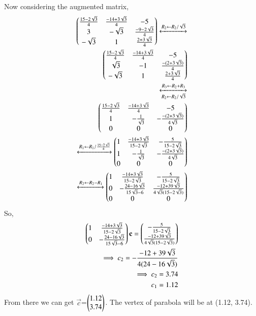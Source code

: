 \documentclass[journal,12pt,twocolumn]{IEEEtran}
\begin{document}
Now considering the augmented matrix,
\begin{align}
\begin{pmatrix}\frac{15-2\sqrt{3}}{4} & \frac{-14+3\sqrt{3}}{4} & -5\\3 & -\sqrt{3} & \frac{-9-2\sqrt{3}}{4}\\-\sqrt{3} & 1 & \frac{2+3\sqrt{3}}{4}\end{pmatrix}\xleftrightarrow[]{R_2\leftarrow R_2/\sqrt{3}}\\
\begin{pmatrix}\frac{15-2\sqrt{3}}{4} & \frac{-14+3\sqrt{3}}{4} & -5\\\sqrt{3} & -1 & \frac{-(2+3\sqrt{3})}{4}\\-\sqrt{3} & 1 & \frac{2+3\sqrt{3}}{4}\end{pmatrix}\\
\xleftrightarrow[R_2\leftarrow R_2/\sqrt{3}]{R_3\leftarrow R_2+R_3}\\
\begin{pmatrix}\frac{15-2\sqrt{3}}{4} & \frac{-14+3\sqrt{3}}{4} & -5\\1 & -\frac{1}{\sqrt{3}} & -\frac{-(2+3\sqrt{3})}{4\sqrt{3}}\\0 & 0 & 0\end{pmatrix}\\
\xleftrightarrow[]{R_1\leftarrow R_1/\frac{15-2\sqrt{3}}{4}}
\begin{pmatrix}1 & \frac{-14+3\sqrt{3}}{15-2\sqrt{3}} & -\frac{5}{15-2\sqrt{3}}\\1 & -\frac{1}{\sqrt{3}} & -\frac{-(2+3\sqrt{3})}{4\sqrt{3}}\\0 & 0 & 0\end{pmatrix}\\
\xleftrightarrow[]{R_2\leftarrow R_2-R_1}
\begin{pmatrix}1 & \frac{-14+3\sqrt{3}}{15-2\sqrt{3}} & -\frac{5}{15-2\sqrt{3}}\\0 & -\frac{24-16\sqrt{3}}{15\sqrt{3}-6} & \frac{-12+39\sqrt{3}}{4\sqrt{3}(15-2\sqrt{3})}\\0 & 0 & 0\end{pmatrix}
\end{align}
So, 
\begin{align}
\begin{pmatrix}1 & \frac{-14+3\sqrt{3}}{15-2\sqrt{3}}\\0 & -\frac{24-16\sqrt{3}}{15\sqrt{3}-6}\end{pmatrix}\mathbf{c}=\begin{pmatrix}-\frac{5}{15-2\sqrt{3}}\\\frac{-12+39\sqrt{3}}{4\sqrt{3}(15-2\sqrt{3})}\end{pmatrix}\\
\implies c_2= -\frac{-12+39\sqrt{3}}{4(24-16\sqrt{3})}\\
\implies c_2 = 3.74\\
c_1=1.12
\end{align}
From there we can get $\vec{c}$=$\begin{pmatrix}1.12\\3.74\end{pmatrix}$. The vertex of parabola will be at (1.12, 3.74).
\end{document}
